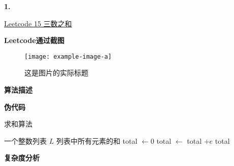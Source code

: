 \documentclass[12pt, a4paper, oneside]{ctexart}
\newenvironment{problem}[1]{%
    \begin{shaded}\par\noindent\textbf{#1. }%
}{%
    \end{shaded}\par
}
\begin{document}
\newpage

\begin{problem}{1}
    \href{https://leetcode.cn/problems/3sum/description/}{Leetcode 15 三数之和}
\end{problem}

\noindent\textbf{\large{Leetcode通过截图}}\\
\begin{figure}[H]  %
    \centering  %
    \texttt{[image: example-image-a]}
    \caption{这是图片的实际标题}  %
    \label{fig:placeholder}  %
\end{figure}

\noindent\textbf{\large{算法描述}}\\

\lipsum[3][1]  %

\vspace{10pt}

\noindent\textbf{\large{伪代码}}\\

\begin{algorithm}[H]
    \caption{求和算法}
    \begin{algorithmic}[1]
        \Require 一个整数列表 $L$
        \Ensure 列表中所有元素的和
        \State total $\gets 0$
            \State total $\gets$ total $+ e$
        \EndFor
        \State \Return total
    \end{algorithmic}
\end{algorithm}

\noindent\textbf{\large{复杂度分析}}\\

\lipsum[3][2]  %
\end{document}
